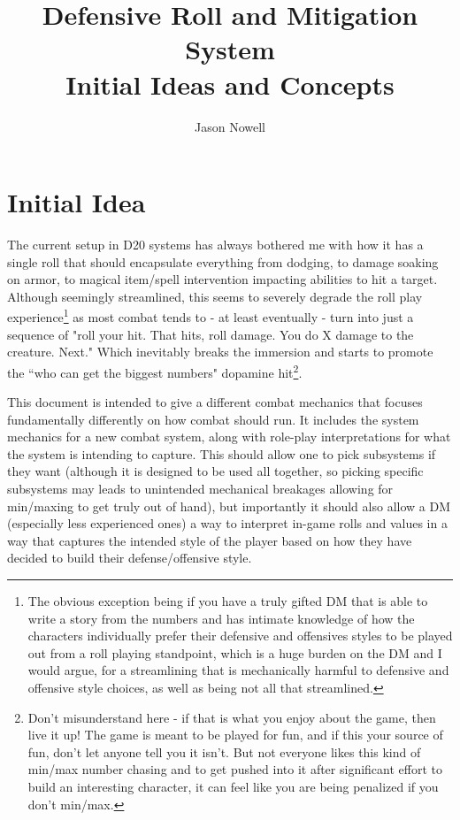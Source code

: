 \documentclass{article}
\title{Defensive Roll and Mitigation System\\
Initial Ideas and Concepts}
\author{Jason Nowell}
\begin{document}
\maketitle
\tableofcontents

\section{Initial Idea}
    The current setup in D20 systems has always bothered me with how it has a single roll that should encapsulate everything from dodging, to damage soaking on armor, to magical item/spell intervention impacting abilities to hit a target. Although seemingly streamlined, this seems to severely degrade the roll play experience\footnote{The obvious exception being if you have a truly gifted DM that is able to write a story from the numbers and has intimate knowledge of how the characters individually prefer their defensive and offensives styles to be played out from a roll playing standpoint, which is a huge burden on the DM and I would argue, for a streamlining that is mechanically harmful to defensive and offensive style choices, as well as being not all that streamlined.} as most combat tends to - at least eventually - turn into just a sequence of "roll your hit. That hits, roll damage. You do X damage to the creature. Next." Which inevitably breaks the immersion and starts to promote the ``who can get the biggest numbers" dopamine hit\footnote{Don't misunderstand here - if that is what you enjoy about the game, then live it up! The game is meant to be played for fun, and if this your source of fun, don't let anyone tell you it isn't. But not everyone likes this kind of min/max number chasing and to get pushed into it after significant effort to build an interesting character, it can feel like you are being penalized if you don't min/max.}.
    
    This document is intended to give a different combat mechanics that focuses fundamentally differently on how combat should run. It includes the system mechanics for a new combat system, along with role-play interpretations for what the system is intending to capture. This should allow one to pick subsystems if they want (although it is designed to be used all together, so picking specific subsystems may leads to unintended mechanical breakages allowing for min/maxing to get truly out of hand), but importantly it should also allow a DM (especially less experienced ones) a way to interpret in-game rolls and values in a way that captures the intended style of the player based on how they have decided to build their defense/offensive style. 
    
\end{document}
